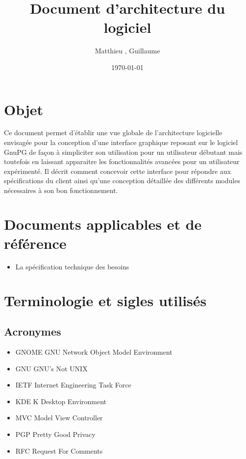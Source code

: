 \documentclass{../res/univ-projet}
\title{Document d'architecture du logiciel}
\author{Matthieu \bsc{Fin}, Guillaume \bsc{Leroy}}
\date{\today}
\begin{document}
\maketitle
\newpage
\tableofcontents
\newpage

\section{Objet}
  Ce document permet d'établir une vue globale de l'architecture logicielle envisagée pour la conception d'une interface graphique reposant sur le logiciel GnuPG de façon à simpliciter son utilisation pour un utilisateur débutant mais toutefois en laissant apparaitre les fonctionnalités avancées pour un utilisateur expérimenté. Il décrit comment concevoir cette interface pour répondre aux spécifications du client ainsi qu'une conception détaillée des différents modules nécessaires à son bon fonctionnement. 

\section{Documents applicables et de référence}
  \begin{itemize}
    \item La spécification technique des besoins
  \end{itemize}

\section{Terminologie et sigles utilisés}
  \subsection{Acronymes}
    \begin{itemize}
      \item GNOME GNU Network Object Model Environment
      \item GNU GNU's Not UNIX
      \item IETF Internet Engineering Task Force
      \item KDE K Desktop Environment
      \item MVC Model View Controller
      \item PGP Pretty Good Privacy
      \item RFC Request For Comments
    \end{itemize}
\end{document}
